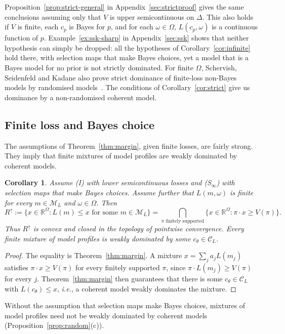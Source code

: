 \documentclass[11pt]{article}
\newtheorem{corollary}[theorem]{Corollary}
\theoremstyle{definition}
\theoremstyle{remark}
\newcommand{\R}{\mathbb R}
\newcommand{\M}{\mathcal M}
\newcommand{\C}{\mathcal C}
\begin{document}
Proposition~\ref{prop:strict-general} in Appendix~\ref{sec:strictproof} gives the same conclusions assuming only that $V$ is upper semicontinuous on $\Delta$. This also holds if $V$ is finite, each $c_p$ is Bayes for $p$, and for each $\omega\in\Omega$, $L(c_p,\omega)$ is a continuous function of $p$. Example~\ref{ex:ssk-sharp} in Appendix~\ref{sec:ssk} shows that neither hypothesis can simply be dropped: all the hypotheses of Corollary~\ref{cor:infinite} hold there, with selection maps that make Bayes choices, yet a model that is a Bayes model for no prior is not strictly dominated.
For finite $\Omega$, Schervish, Seidenfeld and Kadane also prove strict dominance of finite-loss non-Bayes models by randomised models~\cite[Theorem~7]{SSK09}. The conditions of Corollary~\ref{cor:strict} give us dominance by a non-randomised coherent model. 



\subsection{Finite loss and Bayes choice}\label{sec:convexconsequence}
The assumptions of Theorem~\ref{thm:margin}, given finite losses, are fairly strong. They imply that finite mixtures of model profiles are weakly dominated by coherent models.


\begin{corollary}\label{cor:upperconvex}
Assume (I) with lower semicontinuous losses and (S$_\infty$) with selection maps that make Bayes choices. Assume further that $L(m,\omega)$ is finite for every $m\in\M_L$ and $\omega\in\Omega$. Then
\[
 R^\uparrow:=\{x\in\R^\Omega:L(m)\le x\text{ for some }m\in\M_L\}
 =\bigcap_{\pi\text{ finitely supported}}
 \{x\in\R^\Omega:\pi\cdot x\ge V(\pi)\}.
\]
Thus $R^\uparrow$ is convex and closed in the topology of pointwise convergence. Every finite mixture of model profiles is weakly dominated by some $c_\theta\in\C_L$.
\end{corollary}
\begin{proof}
The equality is Theorem~\ref{thm:margin}. A mixture $x=\sum_j a_jL(m_j)$ satisfies $\pi\cdot x\ge V(\pi)$ for every finitely supported $\pi$, since $\pi\cdot L(m_j)\ge V(\pi)$ for every $j$. Theorem~\ref{thm:margin} then guarantees that there is some $c_\theta\in\C_L$ with $L(c_\theta)\le x$, \textit{i.e.}, a coherent model weakly dominates the mixture.
\end{proof}
Without the assumption that selection maps make Bayes choices, mixtures of model profiles need not be weakly dominated by coherent models (Proposition~\ref{prop:random}(c)).
\end{document}
